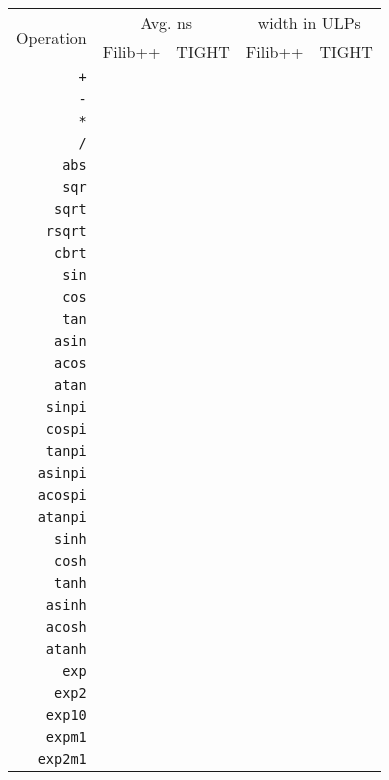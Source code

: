 \begin{table}
\centering
\label{table:benchmarks}
\caption{}
\begin{tabular}{r|rr|rr}
\multirow{2}{*}{Operation} & \multicolumn{2}{c|}{Avg. ns} & \multicolumn{2}{c}{width in ULPs} \\
& Filib++ & TIGHT & Filib++ & TIGHT \\
\hline
\texttt{+} &  &  &  &  \\
\texttt{-} &  &  &  &  \\
\texttt{*} &  &  &  &  \\
\texttt{/} &  &  &  &  \\
\texttt{abs} &  &  &  &  \\
\texttt{sqr} &  &  &  &  \\
\texttt{sqrt} &  &  &  &  \\
\texttt{rsqrt} &  &  &  &  \\
\texttt{cbrt} &  &  &  &  \\
\texttt{sin} &  &  &  &  \\
\texttt{cos} &  &  &  &  \\
\texttt{tan} &  &  &  &  \\
\texttt{asin} &  &  &  &  \\
\texttt{acos} &  &  &  &  \\
\texttt{atan} &  &  &  &  \\
\texttt{sinpi} &  &  &  &  \\
\texttt{cospi} &  &  &  &  \\
\texttt{tanpi} &  &  &  &  \\
\texttt{asinpi} &  &  &  &  \\
\texttt{acospi} &  &  &  &  \\
\texttt{atanpi} &  &  &  &  \\
\texttt{sinh} &  &  &  &  \\
\texttt{cosh} &  &  &  &  \\
\texttt{tanh} &  &  &  &  \\
\texttt{asinh} &  &  &  &  \\
\texttt{acosh} &  &  &  &  \\
\texttt{atanh} &  &  &  &  \\
\texttt{exp} &  &  &  &  \\
\texttt{exp2} &  &  &  &  \\
\texttt{exp10} &  &  &  &  \\
\texttt{expm1} &  &  &  &  \\
\texttt{exp2m1} &  &  &  &  \\

\end{tabular}
\end{table}
